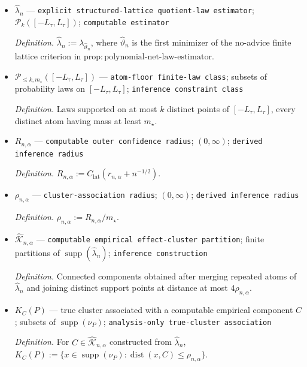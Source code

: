 \documentclass{article}
\begin{document}
\begin{itemize}
  \item \(\widehat\lambda_n\) --- \texttt{explicit structured-\allowbreak{}lattice quotient-\allowbreak{}law estimator}; \(\mathcal P_k([-L_{\tau},L_{\tau}])\); \texttt{computable estimator}
  \par\smallskip\noindent\emph{Definition.} \(\widehat\lambda_n:=\lambda_{\widehat\vartheta_n}\), where \(\widehat\vartheta_n\) is the first minimizer of the no-advice finite lattice criterion in \(\mathrm{prop:polynomial\text{-}net\text{-}law\text{-}estimator}\).
  \item \(\mathcal P_{\le k,m_\star}([-L_{\tau},L_{\tau}])\) --- \texttt{atom-\allowbreak{}floor finite-\allowbreak{}law class}; subsets of probability laws on \([-L_{\tau},L_{\tau}]\); \texttt{inference constraint class}
  \par\smallskip\noindent\emph{Definition.} Laws supported on at most \(k\) distinct points of \([-L_{\tau},L_{\tau}]\), every distinct atom having mass at least \(m_\star\).
  \item \(R_{n,\alpha}\) --- \texttt{computable outer confidence radius}; \((0,\infty)\); \texttt{derived inference radius}
  \par\smallskip\noindent\emph{Definition.} \(R_{n,\alpha}:=C_{\mathrm{lat}}(r_{n,\alpha}+n^{-1/2})\).
  \item \(\rho_{n,\alpha}\) --- \texttt{cluster-\allowbreak{}association radius}; \((0,\infty)\); \texttt{derived inference radius}
  \par\smallskip\noindent\emph{Definition.} \(\rho_{n,\alpha}:=R_{n,\alpha}/m_\star\).
  \item \(\widehat{\mathscr K}_{n,\alpha}\) --- \texttt{computable empirical effect-\allowbreak{}cluster partition}; finite partitions of \(\operatorname{supp}(\widehat\lambda_n)\); \texttt{inference construction}
  \par\smallskip\noindent\emph{Definition.} Connected components obtained after merging repeated atoms of \(\widehat\lambda_n\) and joining distinct support points at distance at most \(4\rho_{n,\alpha}\).
  \item \(K_C(P)\) --- true cluster associated with a computable empirical component \(C\); subsets of \(\operatorname{supp}(\nu_P)\); \texttt{analysis-\allowbreak{}only true-\allowbreak{}cluster association}
  \par\smallskip\noindent\emph{Definition.} For \(C\in\widehat{\mathscr K}_{n,\alpha}\) constructed from \(\widehat\lambda_n\), \(K_C(P):=\{x\in\operatorname{supp}(\nu_P):\operatorname{dist}(x,C)\le\rho_{n,\alpha}\}\).

\end{itemize}
\end{document}
